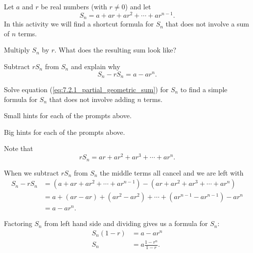 \begin{activity} \label{A:7.2.2}  
Let $a$ and $r$ be real numbers (with $r \ne 0$) and let
\[S_n = a+ar+ar^2 + \cdots + ar^{n-1}.\]
In this activity we will find a shortcut formula for $S_n$ that does not involve a sum of $n$ terms.
\ba
\item Multiply $S_n$ by $r$. What does the resulting sum look like?


\item Subtract $rS_n$ from $S_n$ and explain why
\begin{equation} \label{eq:7.2.1_partial_geometric_sum}
S_n - rS_n = a - ar^n.
\end{equation}


\item Solve equation (\ref{eq:7.2.1_partial_geometric_sum}) for $S_n$ to find a simple formula for $S_n$ that does not involve adding $n$ terms.


\ea
\end{activity}

\begin{smallhint}
\ba
	\item Small hints for each of the prompts above.
\ea
\end{smallhint}
\begin{bighint}
\ba
	\item Big hints for each of the prompts above.
\ea
\end{bighint}
\begin{activitySolution}
\ba
	\item Note that
\[rS_n = ar+ar^2+ar^3 + \cdots + ar^n.\]
    \item When we subtract $rS_n$ from $S_n$ the middle terms all cancel and we are left with
\begin{align*}
S_n - rS_n &= \left(a+ar+ar^2 + \cdots + ar^{n-1}\right) - \left(ar+ar^2+ar^3 + \cdots + ar^n\right) \\
    &=a + (ar-ar) + \left(ar^2-ar^2\right) + \cdots + \left(ar^{n-1}-ar^{n-1}\right) - ar^n \\
    &= a - ar^n.
    \end{align*}
    \item Factoring $S_n$ from left hand side and dividing gives us a formula for $S_n$:
\begin{align*}
S_n(1-r) &= a - ar^n \\
S_n &= a\frac{1-r^n}{1-r}.
\end{align*}

\ea
\end{activitySolution}
\aftera